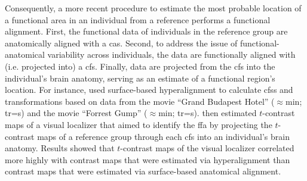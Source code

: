 Consequently, a more recent procedure \citep[e.g.,][]{jiahui2020predicting,
guntupalli2016model, haxby2011common} to estimate the most probable location of
a functional area in an individual from a reference performs a functional
alignment.
First, the functional data of individuals in the reference group are
anatomically aligned with a \ac{cas}.
%
Second, to address the issue of functional-anatomical variability across
individuals, the data are functionally aligned with (i.e. projected into) a
\ac{cfs}.
%
Finally, data are projected from the \ac{cfs} into the individual's
brain anatomy, serving as an estimate of a functional region's location.
For instance, \citet{jiahui2020predicting} used surface-based hyperalignment to
calculate \acp{cfs} and transformations based on data from
%
the movie ``Grand Budapest Hotel'' ($\approx$\unit[50]{min};
\ac{tr}=\unit[1]{s}) and
%
the movie ``Forrest Gump'' ($\approx$\unit[120]{min}; \ac{tr}=\unit[2]{s}).
%
\citet{jiahui2020predicting} then estimated $t$-contrast maps of a visual
localizer that aimed to identify the \ac{ffa} by projecting the $t$-contrast
maps of a reference group through each \ac{cfs} into an individual's brain
anatomy.
%
Results showed that $t$-contrast maps of the visual localizer correlated more
highly with contrast maps that were estimated via hyperalignment than contrast
maps that were estimated via surface-based anatomical alignment.






